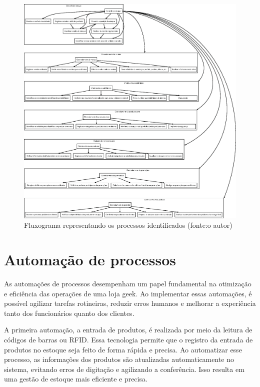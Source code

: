 \documentclass[
	12pt,				%
	openright,			%
	twoside,			%
	a4paper,			%
	english,			%
	brazil				%
	]{abntex2}
\begin{document}
\clearpage %

\begin{figure}[htb] %
	\centering
	\includegraphics[width=\linewidth]{img/fluxograma.eps}
	\caption{Fluxograma representando os processos identificados (fonte:o autor)}
	\label{fig:fluxograma}
\end{figure}

\chapter{Automação de processos}\label{auto_process}

As automações de processos desempenham um papel fundamental na otimização e eficiência das operações de uma loja geek. Ao implementar essas automações, é possível agilizar tarefas rotineiras, reduzir erros humanos e melhorar a experiência tanto dos funcionários quanto dos clientes.

A primeira automação, a entrada de produtos, é realizada por meio da leitura de códigos de barras ou RFID. Essa tecnologia permite que o registro da entrada de produtos no estoque seja feito de forma rápida e precisa. Ao automatizar esse processo, as informações dos produtos são atualizadas automaticamente no sistema, evitando erros de digitação e agilizando a conferência. Isso resulta em uma gestão de estoque mais eficiente e precisa.
\end{document}
